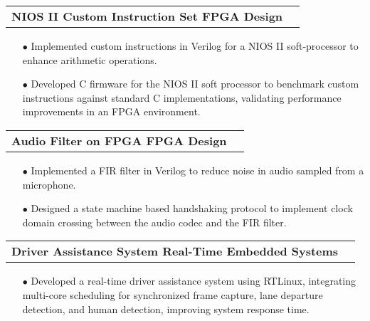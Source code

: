 \documentclass[11pt]{article}
\makeatletter
\newcommand{\resumeSubheadingP}[2]{
  \vspace{-2pt}\item
    \begin{tabular*}{1.0\textwidth}[t]{l@{\extracolsep{\fill}}r}
       \textbf{{\large #1}}&{#2} \\
    \end{tabular*}\vspace{-1pt}
}
\makeatother
\begin{document}
\resumeSubheadingP
{NIOS II Custom Instruction Set \textbar{ } FPGA Design}{}
\begin{itemize}[leftmargin=0.3in]\setlength{\itemsep}{0pt}\setlength{\parskip}{0pt}\vspace{-0.2cm}
  \item[$\bullet$] Implemented custom instructions in Verilog for a NIOS II soft-processor to enhance arithmetic operations.
  \item[$\bullet$] Developed C firmware for the NIOS II soft processor to benchmark custom instructions against standard C implementations, validating performance improvements in an FPGA environment.
\end{itemize}
\vspace{-0.2cm}

\resumeSubheadingP
{Audio Filter on FPGA \textbar{ } FPGA Design}{ }
\begin{itemize}[leftmargin=0.3in]\setlength{\itemsep}{0pt}\setlength{\parskip}{0pt}\vspace{-0.2cm}
  \item[$\bullet$] Implemented a FIR filter in Verilog to reduce noise in audio sampled from a microphone.
  \item[$\bullet$] Designed a state machine based handshaking protocol to implement clock domain crossing between the audio codec and the FIR filter.
\end{itemize}
\vspace{-0.3cm}

\resumeSubheadingP
{Driver Assistance System \textbar{ } Real-Time Embedded Systems }{}
\begin{itemize}[leftmargin=0.3in]\setlength{\itemsep}{0pt}\setlength{\parskip}{0pt}\vspace{-0.2cm}
  \item[$\bullet$] Developed a real-time driver assistance system using RTLinux, integrating multi-core scheduling for synchronized frame capture, lane departure detection, and human detection, improving system response time.
\end{itemize}
\vspace{-0.2cm}
\end{document}
